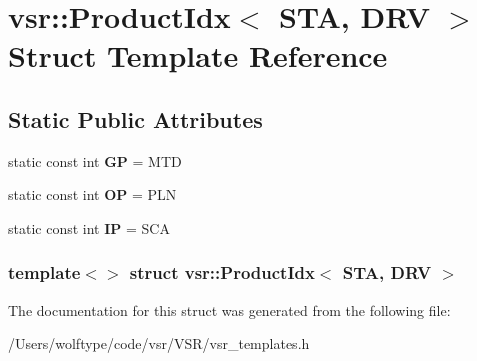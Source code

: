 \hypertarget{structvsr_1_1_product_idx_3_01_s_t_a_00_01_d_r_v_01_4}{\section{vsr\-:\-:Product\-Idx$<$ S\-T\-A, D\-R\-V $>$ Struct Template Reference}
\label{structvsr_1_1_product_idx_3_01_s_t_a_00_01_d_r_v_01_4}
}
\subsection*{Static Public Attributes}
\begin{DoxyCompactItemize}
\item 
\hypertarget{structvsr_1_1_product_idx_3_01_s_t_a_00_01_d_r_v_01_4_afb9d10e2f525b57e0e215797bec45d4d}{static const int {\bfseries G\-P} = M\-T\-D}\label{structvsr_1_1_product_idx_3_01_s_t_a_00_01_d_r_v_01_4_afb9d10e2f525b57e0e215797bec45d4d}

\item 
\hypertarget{structvsr_1_1_product_idx_3_01_s_t_a_00_01_d_r_v_01_4_ad853b886c81fe2a7b2bc81a765b3c60a}{static const int {\bfseries O\-P} = P\-L\-N}\label{structvsr_1_1_product_idx_3_01_s_t_a_00_01_d_r_v_01_4_ad853b886c81fe2a7b2bc81a765b3c60a}

\item 
\hypertarget{structvsr_1_1_product_idx_3_01_s_t_a_00_01_d_r_v_01_4_afa795036beb7ec5aefdd365104ba2b75}{static const int {\bfseries I\-P} = S\-C\-A}\label{structvsr_1_1_product_idx_3_01_s_t_a_00_01_d_r_v_01_4_afa795036beb7ec5aefdd365104ba2b75}

\end{DoxyCompactItemize}
\subsubsection*{template$<$$>$ struct vsr\-::\-Product\-Idx$<$ S\-T\-A, D\-R\-V $>$}



The documentation for this struct was generated from the following file\-:\begin{DoxyCompactItemize}
\item 
/\-Users/wolftype/code/vsr/\-V\-S\-R/vsr\-\_\-templates.\-h\end{DoxyCompactItemize}
